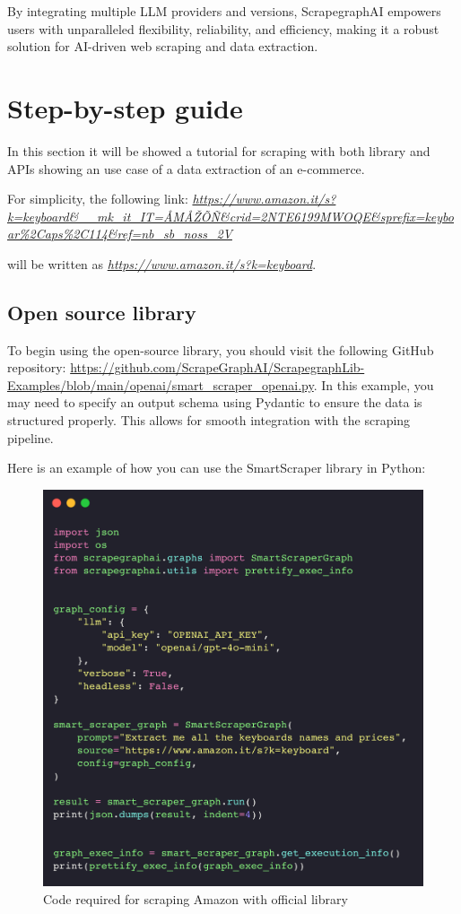 By integrating multiple LLM providers and versions, ScrapegraphAI empowers users with unparalleled flexibility, reliability, and efficiency, making it a robust solution for AI-driven web scraping and data extraction.
\section{Step-by-step guide}
In this section it will be showed a tutorial for scraping with both library and APIs showing an use case of a data extraction of an e-commerce.

For simplicity, the following link: \textit{\url{https://www.amazon.it/s?k=keyboard&__mk_it_IT=ÅMÅŽÕÑ&crid=2NTE6199MWOQE&sprefix=keyboar\%2Caps\%2C114&ref=nb_sb_noss_2V}}

will be written as \textit{\url{https://www.amazon.it/s?k=keyboard}}.

\subsection{Open source library}

To begin using the open-source library, you should visit the following GitHub repository: \url{https://github.com/ScrapeGraphAI/ScrapegraphLib-Examples/blob/main/openai/smart_scraper_openai.py}. In this example, you may need to specify an output schema using Pydantic to ensure the data is structured properly. This allows for smooth integration with the scraping pipeline.

Here is an example of how you can use the SmartScraper library in Python:

\begin{figure}[H]
    \centering
    \includegraphics[width=0.95\linewidth]{Assets/library.png}
    \caption{Code required for scraping Amazon with official library}
    \label{fig:enter-label}
\end{figure}

